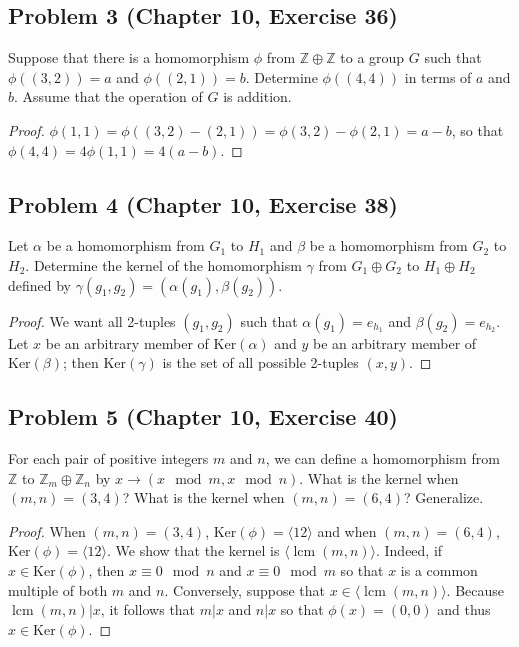 \documentclass{article}
\DeclareMathOperator{\lcm}{lcm}
\begin{document}
\subsection*{Problem 3 (Chapter 10, Exercise 36)}
Suppose that there is a homomorphism $\phi$ from $\mathbb{Z} \oplus \mathbb{Z}$ to a group $G$ such that $\phi((3, 2)) = a$ and $\phi((2, 1)) = b$. Determine $\phi((4, 4))$ in terms of $a$ and $b$. Assume that the operation of $G$ is addition.
\begin{proof}
$\phi(1, 1) = \phi((3, 2) - (2, 1)) = \phi(3, 2) - \phi(2, 1) = a - b$, so that $\phi(4, 4) = 4\phi(1, 1) = 4(a-b)$.
\end{proof}

\subsection*{Problem 4 (Chapter 10, Exercise 38)}
Let $\alpha$ be a homomorphism from $G_1$ to $H_1$ and $\beta$ be a homomorphism from $G_2$ to $H_2$. Determine the kernel of the homomorphism $\gamma$ from $G_1 \oplus G_2$ to $H_1 \oplus H_2$ defined by $\gamma(g_1, g_2) = (\alpha(g_1), \beta(g_2))$.
\begin{proof} 
We want all 2-tuples $(g_1, g_2)$ such that $\alpha(g_1) = e_{h_1}$ and $\beta(g_2) = e_{h_2}$. Let $x$ be an arbitrary member of $\text{Ker}(\alpha)$ and $y$ be an arbitrary member of $\text{Ker}(\beta)$; then $\text{Ker}(\gamma)$ is the set of all possible 2-tuples $(x, y)$.
\end{proof}

\subsection*{Problem 5 (Chapter 10, Exercise 40)}
For each pair of positive integers $m$ and $n$, we can define a homomorphism from $\mathbb{Z}$ to $\mathbb{Z}_m \oplus \mathbb{Z}_n$ by $x \to (x \mod m, x \mod n)$. What is the kernel when $(m, n) = (3, 4)$? What is the kernel when $(m, n) = (6, 4)$? Generalize.
\begin{proof} 
When $(m, n) = (3, 4)$, $\text{Ker}(\phi) = \langle 12 \rangle$ and when $(m, n) = (6, 4)$, $\text{Ker}(\phi) = \langle 12 \rangle$. We show that the kernel is $\langle\lcm{(m, n)}\rangle$. Indeed, if $x \in \text{Ker}(\phi)$, then $x \equiv 0 \mod n$ and $x \equiv 0 \mod m$ so that $x$ is a common multiple of both $m$ and $n$. Conversely, suppose that $x \in \langle\lcm{(m, n)}\rangle$. Because $\lcm{(m, n)} | x$, it follows that $m | x$ and $n | x$ so that $\phi(x) = (0, 0)$ and thus $x \in \text{Ker}(\phi)$.
\end{proof}
\end{document}
